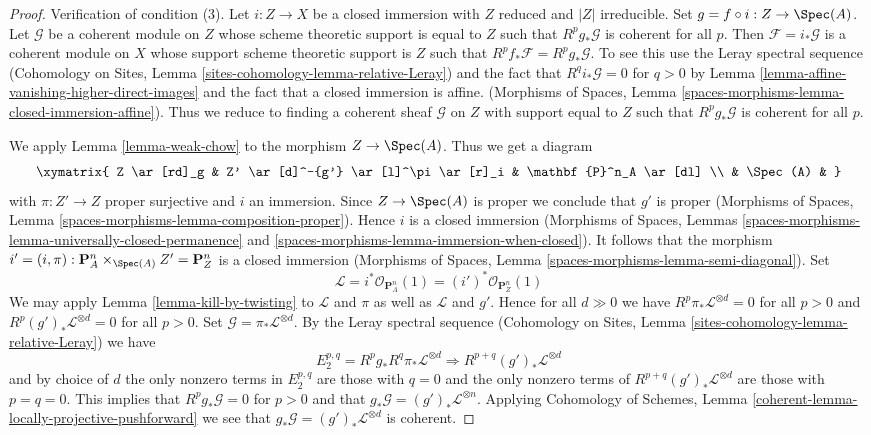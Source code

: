 \begin{proof}
\medskip\noindent
Verification of condition (3). Let $i : Z \to X$ be a closed immersion
with $Z$ reduced and $|Z|$ irreducible. Set $g = f \circ i : Z \to \Spec(A)$.
Let $\mathcal{G}$ be a coherent module on $Z$ whose scheme theoretic support
is equal to $Z$ such that $R^pg_*\mathcal{G}$ is coherent for all $p$.
Then $\mathcal{F} = i_*\mathcal{G}$ is a coherent module on
$X$ whose support scheme theoretic support is $Z$ such that
$R^pf_*\mathcal{F} = R^pg_*\mathcal{G}$. To see this use
the Leray spectral sequence
(Cohomology on Sites, Lemma \ref{sites-cohomology-lemma-relative-Leray})
and the fact that $R^qi_*\mathcal{G} = 0$ for $q > 0$ by
Lemma \ref{lemma-affine-vanishing-higher-direct-images}
and the fact that a closed immersion is affine.
(Morphisms of Spaces, Lemma
\ref{spaces-morphisms-lemma-closed-immersion-affine}).
Thus we reduce to finding a coherent sheaf $\mathcal{G}$ on $Z$
with support equal to $Z$ such that $R^pg_*\mathcal{G}$ is coherent
for all $p$.

\medskip\noindent
We apply Lemma \ref{lemma-weak-chow} to the morphism $Z \to \Spec(A)$.
Thus we get a diagram
$$
\xymatrix{
Z \ar[rd]_g & Z' \ar[d]^-{g'} \ar[l]^\pi \ar[r]_i & \mathbf{P}^n_A \ar[dl] \\
& \Spec(A) &
}
$$
with $\pi : Z' \to Z$ proper surjective and $i$ an immersion.
Since $Z \to \Spec(A)$ is proper we conclude that $g'$ is proper
(Morphisms of Spaces, Lemma \ref{spaces-morphisms-lemma-composition-proper}).
Hence $i$ is a closed immersion
(Morphisms of Spaces, Lemmas
\ref{spaces-morphisms-lemma-universally-closed-permanence} and
\ref{spaces-morphisms-lemma-immersion-when-closed}).
It follows that the morphism
$i' = (i, \pi) : \mathbf{P}^n_A \times_{\Spec(A)} Z' = \mathbf{P}^n_Z$ is
a closed immersion
(Morphisms of Spaces, Lemma \ref{spaces-morphisms-lemma-semi-diagonal}).
Set
$$
\mathcal{L} =
i^*\mathcal{O}_{\mathbf{P}^n_A}(1) =
(i')^*\mathcal{O}_{\mathbf{P}^n_Z}(1)
$$
We may apply Lemma \ref{lemma-kill-by-twisting}
to $\mathcal{L}$ and $\pi$ as well as $\mathcal{L}$ and $g'$. 
Hence for all $d \gg 0$ we have
$R^p\pi_*\mathcal{L}^{\otimes d} = 0$ for all $p > 0$ and
$R^p(g')_*\mathcal{L}^{\otimes d} = 0$ for all $p > 0$.
Set $\mathcal{G} = \pi_*\mathcal{L}^{\otimes d}$.
By the Leray spectral sequence
(Cohomology on Sites, Lemma \ref{sites-cohomology-lemma-relative-Leray})
we have
$$
E_2^{p, q} = R^pg_* R^q\pi_*\mathcal{L}^{\otimes d}
\Rightarrow
R^{p + q}(g')_*\mathcal{L}^{\otimes d}
$$
and by choice of $d$ the only nonzero terms in $E_2^{p, q}$ are
those with $q = 0$ and the only nonzero terms of
$R^{p + q}(g')_*\mathcal{L}^{\otimes d}$ are those with $p = q = 0$.
This implies that $R^pg_*\mathcal{G} = 0$ for $p > 0$ and
that $g_*\mathcal{G} = (g')_*\mathcal{L}^{\otimes n}$.
Applying
Cohomology of Schemes, Lemma
\ref{coherent-lemma-locally-projective-pushforward}
we see that $g_*\mathcal{G} = (g')_*\mathcal{L}^{\otimes d}$ is
coherent.


\end{proof}
